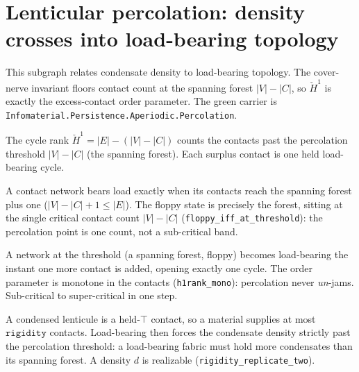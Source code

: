 \section{Lenticular percolation: density crosses into load-bearing topology}

This subgraph relates condensate density to load-bearing topology.  The
cover-nerve invariant floors contact count at the spanning forest
$|V|-|C|$, so $\check H^1$ is exactly the excess-contact order parameter.
The green carrier is \texttt{Infomaterial.Persistence.Aperiodic.Percolation}.

\begin{proposition}\label{thm:percolation-order-parameter}\leanok{}
The cycle rank $\check H^1 = |E| - (|V| - |C|)$ counts the contacts past the percolation threshold
$|V| - |C|$ (the spanning forest). Each surplus contact is one held load-bearing cycle.
\end{proposition}

\begin{theorem}\label{thm:percolation-threshold-law}\leanok{}
A contact network bears load exactly when its contacts reach the spanning forest plus one
($|V| - |C| + 1 \le |E|$). The floppy state is precisely the forest, sitting at the single critical
contact count $|V| - |C|$ (\texttt{floppy\_iff\_at\_threshold}): the percolation point is one count,
not a sub-critical band.
\end{theorem}

\begin{theorem}\label{thm:percolation-onset}\leanok{}
A network at the threshold (a spanning forest, floppy) becomes load-bearing the instant one more
contact is added, opening exactly one cycle. The order parameter is monotone in the contacts
(\texttt{h1rank\_mono}): percolation never \emph{un}-jams. Sub-critical to super-critical in one step.
\end{theorem}

\begin{theorem}\label{thm:percolation-density-necessary}\leanok{}
A condensed lenticule is a held-$\top$ contact, so a material supplies at most $\texttt{rigidity}$
contacts. Load-bearing then forces the condensate density strictly past the percolation threshold: a
load-bearing fabric must hold more condensates than its spanning forest. A density $d$ is realizable
(\texttt{rigidity\_replicate\_two}).
\end{theorem}

